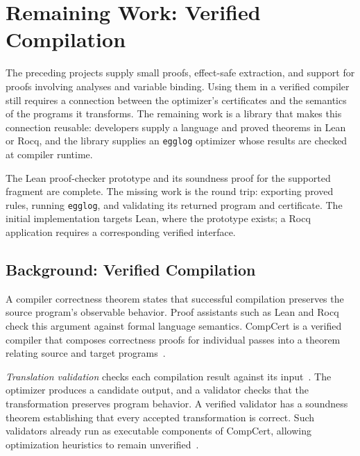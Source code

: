 \section{Remaining Work: Verified Compilation}
\label{sec:proposed-research}

The preceding projects supply small proofs, effect-safe extraction,
  and support for proofs involving analyses and variable binding.
Using them in a verified compiler still requires a connection between
  the optimizer's certificates and the semantics of the programs it transforms.
The remaining work is a library that makes this connection reusable:
  developers supply a language and proved theorems in Lean or Rocq,
  and the library supplies an \texttt{egglog} optimizer whose results are checked at compiler runtime.

The Lean proof-checker prototype and its soundness proof for the supported fragment are complete.
The missing work is the round trip: exporting proved rules, running \texttt{egglog},
  and validating its returned program and certificate.
The initial implementation targets Lean, where the prototype exists;
  a Rocq application requires a corresponding verified interface.

\subsection{Background: Verified Compilation}
\label{sec:background-verification}

A compiler correctness theorem states that successful compilation preserves
  the source program's observable behavior.
Proof assistants such as Lean and Rocq check this argument against formal language semantics.
CompCert is a verified compiler that composes correctness proofs for individual passes
  into a theorem relating source and target programs~\cite{compcert-backend}.

\emph{Translation validation} checks each compilation result against its input~\cite{translation-validation}.
The optimizer produces a candidate output, and a validator checks
  that the transformation preserves program behavior.
A verified validator has a soundness theorem establishing that every accepted transformation is correct.
Such validators already run as executable components of CompCert,
  allowing optimization heuristics to remain unverified~\cite{verified-lazy-code-motion}.

